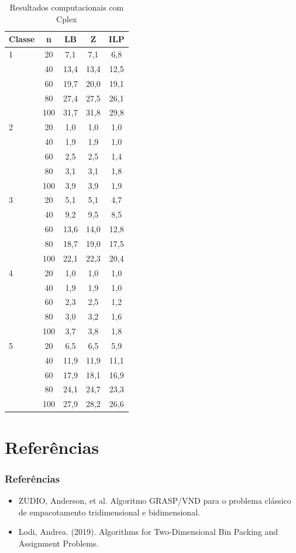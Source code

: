 \documentclass{beamer}
\begin{document}
\begin{frame}


\begin{table}
    \tiny
    
    \begin{tabular}{| l | c | c | c | c | }
     \hline
    Classe & n & LB & Z & ILP \\
    \hline
    1 & 20 & 7,1 & 7,1 & 6,8 \\
      & 40 & 13,4 & 13,4 & 12,5 \\
      & 60 & 19,7 & 20,0 & 19,1 \\ 
      & 80 & 27,4 & 27,5 & 26,1 \\
      & 100 & 31,7 & 31,8 & 29,8 \\
    \hline
    2 & 20 & 1,0 & 1,0 & 1,0 \\
      & 40 & 1,9 & 1,9 & 1,0 \\
      & 60 & 2,5 & 2,5 & 1,4 \\ 
      & 80 & 3,1 & 3,1 & 1,8 \\
      & 100 & 3,9 & 3,9 & 1,9 \\
    \hline
     3 & 20 & 5,1 & 5,1 & 4,7 \\
      & 40 &  9,2 & 9,5 & 8,5 \\
      & 60 & 13,6 & 14,0 & 12,8 \\ 
      & 80 & 18,7 & 19,0 & 17,5 \\
      & 100 & 22,1 & 22,3 & 20,4 \\
    \hline
     4 & 20 & 1,0 & 1,0 & 1,0\\
      & 40 & 1,9 & 1,9 & 1,0\\
      & 60 & 2,3 & 2,5 & 1,2 \\ 
      & 80 & 3,0 & 3,2 & 1,6 \\
      & 100 & 3,7 & 3,8 & 1,8 \\
    \hline
     5 & 20 & 6,5 & 6,5 & 5,9 \\
      & 40 & 11,9 & 11,9 & 11,1 \\
      & 60 & 17,9 & 18,1 & 16,9 \\ 
      & 80 & 24,1 & 24,7 & 23,3 \\
      & 100 & 27,9 & 28,2 & 26,6 \\
    \hline \hline
    \end{tabular}
    \caption{Resultados  computacionais com Cplex}
\end{table}
\end{frame}

\section{Referências}

\begin{frame}
\frametitle {Referências}

    \begin{itemize}
    \item ZUDIO, Anderson, et al. Algoritmo GRASP/VND para o problema clássico de empacotamento tridimensional e bidimensional.
    \item Lodi, Andrea. (2019). Algorithms for Two-Dimensional Bin Packing and Assignment Problems. 
    \end{itemize}
\end{frame}
\end{document}
